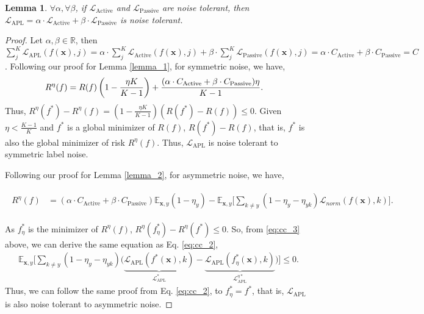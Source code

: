\documentclass{article}
\newtheorem{lemma}{Lemma}
\newcommand{\E}{\mathbb{E}}
\def \xx {{\bm{x}}}
\def \L  {\mathcal{L}}
\begin{document}
\begin{lemma}
$\forall \alpha, \forall \beta$, if $\L_{\text{Active}}$ and $\L_{\text{Passive}}$ are noise tolerant, then $\L_{\text{APL}} = \alpha \cdot \L_{\text{Active}} + \beta \cdot \L_{\text{Passive}}$ is noise tolerant.
\end{lemma}
\begin{proof}
Let $\alpha, \beta \in \mathbb{R}$, then
$\sum_{j}^{K} \L_{\text{APL}}(f(\xx), j) =  \alpha \cdot \sum_{j}^{K} \L_{\text{Active}}(f(\xx), j) + \beta \cdot \sum_{j}^{K} \L_{\text{Passive}}(f(\xx), j) = \alpha \cdot C_{\text{Active}} + \beta \cdot C_{\text{Passive}} = C$.
Following our proof for Lemma \ref{lemma_1}, for symmetric noise, we have,
\begin{align*}
	\small
	R^\eta(f) & = R(f)\left(1-\frac{\eta K}{K-1}\right) + \frac{(\alpha \cdot C_{\text{Active}} + \beta \cdot C_{\text{Passive}})\eta}{K-1}.
\end{align*}
Thus, $R^\eta(f^*)-R^\eta(f)=(1-\frac{\eta K}{K-1})(R(f^*)-R(f)) \leq 0$.
Given $\eta < \frac{K-1}{K}$ and $f^*$ is a global minimizer of $R(f)$, $R(f^*)-R(f)$, that is, $f^*$ is also the global minimizer of risk $R^\eta(f)$. Thus, $\L_{\text{APL}}$ is noise tolerant to symmetric label noise. 

Following our proof for Lemma \ref{lemma_2}, for asymmetric noise, we have,

\small{
	\begin{align}
	\label{eq:cc_3}
	\begin{split}
	R^\eta(f) & = (\alpha \cdot C_{\text{Active}} + \beta \cdot C_{\text{Passive}}) \E_{\xx, y} (1-\eta_{y})-\E_{\xx, y} \Big[\sum_{k \neq y}(1-\eta_{y}-\eta_{y k}) \L_{norm}(f(\xx), k)\Big].
	\end{split}
	\end{align}	}
	
As $f^{\ast}_{\eta}$ is the minimizer of $R^\eta(f)$, $R^{\eta}(f_{\eta}^{\ast})-R^{\eta}(f^{\ast}) \leq  0$. So, from \ref{eq:cc_3} above, we can derive the same equation as Eq. \eqref{eq:cc_2},
	\begin{align}
	\label{eq:cc_4}
	\E_{\xx, y}\Big[\sum_{k\neq y}(1-\eta_{y}-\eta_{y k})\big(\underbrace{\L_{\text{APL}} (f^{\ast}(\xx),k)}_{\L_{\text{APL}}^{*}}-\underbrace{\L_{\text{APL}}(f^{\ast}_{\eta}(\xx),k)}_{\L_{\text{APL}}^{\eta *}}\big)\Big] \leq 0.
	\end{align}
 Thus, we can follow the same proof from Eq. \eqref{eq:cc_2}, to $f^{*}_{\eta} = f^{*}$, that is, $\L_{\text{APL}}$ is also noise tolerant to asymmetric noise.
\end{proof}
\end{document}

